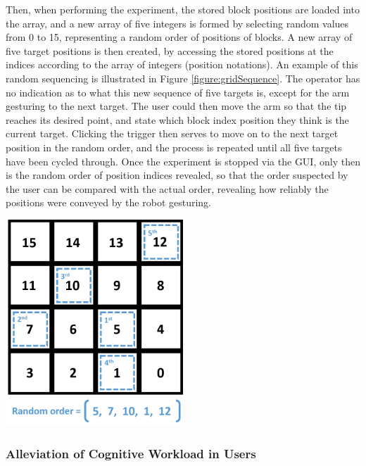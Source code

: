 \documentclass[11pt]{article}
\begin{document}
Then, when performing the experiment, the stored block positions are loaded into the array, and a new array of five integers is formed by selecting random values from 0 to 15, representing a random order of positions of blocks. A new array of five target positions is then created, by accessing the stored positions at the indices according to the array of integers (position notations). An example of this random sequencing is illustrated in Figure \ref{figure:gridSequence}. The operator has no indication as to what this new sequence of five targets is, except for the arm gesturing to the next target. The user could then move the arm so that the tip reaches its desired point, and state which block index position they think is the current target. Clicking the trigger then serves to move on to the next target position in the random order, and the process is repeated until all five targets have been cycled through. Once the experiment is stopped via the GUI, only then is the random order of position indices revealed, so that the order suspected by the user can be compared with the actual order, revealing how reliably the positions were conveyed by the robot gesturing.

\begin{center}
\includegraphics[width=0.5\textwidth]{images/gridSequence.png}
\label{figure:gridSequence}
\end{center}



\subsubsection{Alleviation of Cognitive Workload in Users}
\end{document}
